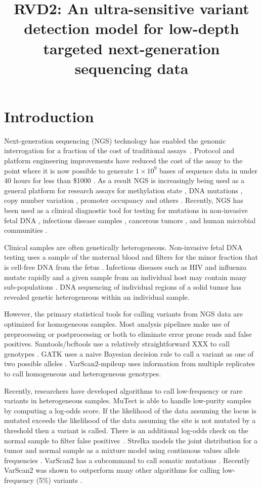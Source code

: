 \documentclass[11pt,reqno]{amsart}
\title[RVD2]{RVD2: An ultra-sensitive variant detection model for low-depth targeted next-generation sequencing data}
\author{}
\begin{document}
\maketitle

\section{Introduction}


Next-generation sequencing (NGS) technology has enabled the genomic interrogation for a fraction of the cost of traditional assays~\cite{Koboldt2013Cell}. Protocol and platform engineering improvements have reduced the cost of the assay to the point where it is now possible to generate $1\times10^9$ bases of sequence data in under 40 hours for less than \$1000 \cite{}. As a result NGS is increasingly being used as a general platform for research assays for methylation state \cite{}, DNA mutations \cite{}, copy number variation \cite{}, promoter occupancy \cite{} and others \cite{}. Recently, NGS has been used as a clinical diagnostic tool for testing for mutations in non-invasive fetal DNA \cite{}, infectious disease samples \cite{}, cancerous tumors \cite{}, and human microbial communities \cite{}. 

Clinical samples are often genetically heterogeneous. Non-invasive fetal DNA testing uses a sample of the maternal blood and filters for the minor fraction that is cell-free DNA from the fetus \cite{}. Infectious diseases such as HIV and influenza mutate rapidly and a given sample from an individual host may contain many sub-populations \cite{}. DNA sequencing of individual regions of a solid tumor has revealed genetic heterogeneous within an individual sample.  

However, the primary statistical tools for calling variants from NGS data are optimized for homogeneous samples. Most analysis pipelines make use of preprocessing or postprocessing or both to eliminate error prone reads and false positives. Samtools/bcftools use a relatively straightforward XXX to call genotypes \cite{}. GATK uses a naive Bayesian decision rule to call a variant as one of two possible alleles \cite{McKenna2010}. VarScan2-mpileup uses information from multiple replicates to call homogeneous and heterogeneous genotypes.

Recently, researchers have developed algorithms to call low-frequency or rare variants in heterogeneous samples. MuTect is able to handle low-purity samples by computing a log-odds score. If the likelihood of the data assuming the locus is mutated exceeds the likelihood of the data assuming the site is not mutated by a threshold then a variant is called. There is an additional log-odds check on the normal sample to filter false positives~\cite{Cibulskis2013}. Strelka models the joint distribution for a tumor and normal sample as a mixture model using continuous values allele frequencies \cite{}. VarScan2 has a subcommand to call somatic mutations \cite{}. Recently VarScan2 was shown to outperform many other algorithms for calling low-frequency (5\%) variants \cite{}. 
\end{document}

